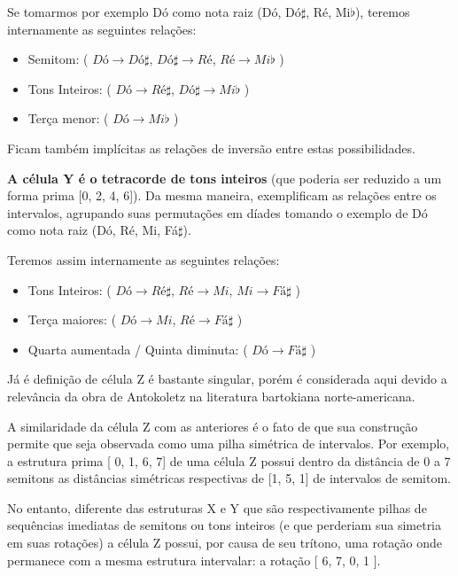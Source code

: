 \documentclass[
	12pt,				%
	openright,			%
	twoside,			%
	a4paper,			%
	english,			%
	french,				%
	spanish,			%
	brazil				%
	]{abntex2}
\begin{document}
Se tomarmos por exemplo Dó como nota raiz (Dó, Dó$\sharp$, Ré, Mi$\flat$), teremos internamente as seguintes relações:


\begin{itemize}
\item Semitom: ( $Dó \rightarrow Dó\sharp$, $Dó\sharp \rightarrow Ré$, $Ré \rightarrow Mi\flat$ ) 

\item Tons Inteiros: ( $Dó \rightarrow Ré\sharp$, $Dó\sharp \rightarrow Mi\flat$ )

\item Terça menor: ( $Dó \rightarrow Mi\flat$ )
\end{itemize}

Ficam também implícitas as relações de inversão entre estas possibilidades.

\textbf{A célula Y é o tetracorde de tons inteiros} (que poderia ser reduzido a um forma prima [0, 2, 4, 6]). Da mesma maneira,  exemplificam as relações entre os intervalos, agrupando suas permutações em díades tomando o exemplo de Dó como nota raiz (Dó, Ré, Mi, Fá$\sharp$). 

Teremos assim internamente as seguintes relações:

\begin{itemize}
\item Tons Inteiros: ( $Dó \rightarrow Ré\sharp$, $Ré \rightarrow Mi$, $Mi \rightarrow Fá\sharp$ ) 

\item Terça maiores: ( $Dó \rightarrow Mi$, $Ré \rightarrow Fá\sharp$ )

\item Quarta aumentada / Quinta diminuta: ( $Dó \rightarrow Fá\sharp$ )
\end{itemize}


Já é definição de célula Z é bastante singular, porém é considerada aqui devido a relevância da obra de Antokoletz na literatura bartokiana norte-americana. 

A similaridade da célula Z com as anteriores é o fato de que sua construção permite que seja observada como uma pilha simétrica de intervalos. Por exemplo, a estrutura prima [ 0, 1, 6, 7] de uma célula Z possui dentro da distância de 0 a 7 semitons as distâncias simétricas respectivas de [1, 5, 1] de intervalos de semitom. 

No entanto, diferente das estruturas X e Y que são respectivamente pilhas de sequências imediatas de semitons ou tons inteiros (e que perderiam sua simetria em suas rotações) a célula Z possui, por causa de seu trítono, uma rotação onde permanece com a mesma estrutura intervalar: a rotação [ 6, 7, 0, 1 ]. 
\end{document}

